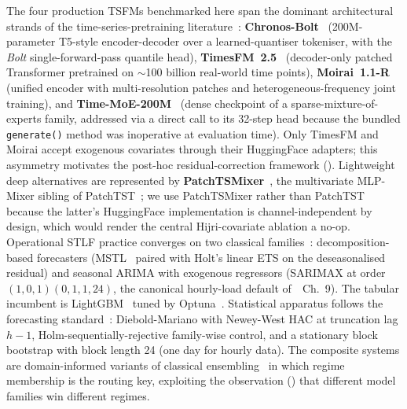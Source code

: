 \documentclass[10pt, a4paper, twocolumn]{article}
\begin{document}
The four production TSFMs benchmarked here span the dominant
architectural strands of the time-series-pretraining
literature~\cite{vaswani2017attention, raffel2020t5}:
\textbf{Chronos-Bolt}~\cite{ansari2024chronos} (200M-parameter
T5-style encoder-decoder over a learned-quantiser tokeniser, with
the \emph{Bolt} single-forward-pass quantile head),
\textbf{TimesFM~2.5}~\cite{das2024timesfm} (decoder-only patched
Transformer pretrained on $\sim$100 billion real-world time
points), \textbf{Moirai~1.1-R}~\cite{woo2024moirai} (unified
encoder with multi-resolution patches and heterogeneous-frequency
joint training), and \textbf{Time-MoE-200M}~\cite{shi2024timemoe}
(dense checkpoint of a sparse-mixture-of-experts family,
addressed via a direct call to its 32-step head because the
bundled \texttt{generate()} method was inoperative at evaluation
time). Only TimesFM and Moirai accept exogenous covariates
through their HuggingFace adapters; this asymmetry motivates the
post-hoc residual-correction framework
(). Lightweight deep alternatives
are represented by \textbf{PatchTSMixer}~\cite{ekambaram2023tsmixer},
the multivariate MLP-Mixer sibling of
PatchTST~\cite{nie2023patchtst}; we use PatchTSMixer rather than
PatchTST because the latter's HuggingFace implementation is
channel-independent by design, which would render the central
Hijri-covariate ablation a no-op. Operational STLF practice
converges on two classical
families~\cite{box2015arima, hyndman2008ets, hyndman2021fpp3}:
decomposition-based forecasters (MSTL~\cite{bandara2021mstl}
paired with Holt's linear ETS on the deseasonalised residual)
and seasonal ARIMA with exogenous regressors (SARIMAX at order
$(1, 0, 1)(0, 1, 1, 24)$, the canonical hourly-load default
of~\cite{hyndman2021fpp3}~Ch.~9). The tabular incumbent is
LightGBM~\cite{ke2017lightgbm} tuned by
Optuna~\cite{akiba2019optuna}. Statistical apparatus follows the
forecasting standard~\cite{diebold1995comparing,
newey1987hac, holm1979sequential, politis1994bootstrap}:
Diebold-Mariano with Newey-West HAC at truncation lag $h - 1$,
Holm-sequentially-rejective family-wise control, and a stationary
block bootstrap with block length 24 (one day for hourly data).
The composite systems are domain-informed variants of classical
ensembling~\cite{dietterich2000ensemble, wolpert1992stacked} in
which regime membership is the routing key, exploiting the
observation () that different model
families win different regimes.

\end{document}
